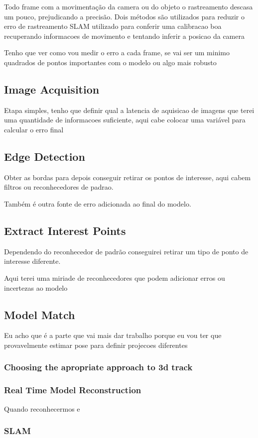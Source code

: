 Todo frame com a movimentação da camera ou do objeto o rastreamento descasa um pouco, prejudicando a precisão.
Dois métodos são utilizados para reduzir o erro de rastreamento
SLAM utilizado para conferir uma calibracao boa recuperando informacoes de movimento e tentando inferir a posicao da camera


Tenho que ver como vou medir o erro a cada frame, se vai ser um minimo quadrados de pontos importantes com o modelo ou algo mais robusto


\subsection{Image Acquisition}

Etapa simples, tenho que definir qual a latencia de aquisicao de imagens que terei uma quantidade de informacoes suficiente, aqui cabe colocar uma variável para calcular o erro final

\subsection{Edge Detection}

Obter as bordas para depois conseguir retirar os pontos de interesse, aqui cabem filtros ou reconhecedores de padrao.

Também é outra fonte de erro adicionada ao final do modelo.

\cite{Drummond99real-timetracking}


\subsection{Extract Interest Points}

Dependendo do reconhecedor de padrão conseguirei retirar um tipo de ponto de interesse diferente.

Aqui terei uma miriade de reconhecedores que podem adicionar erros ou incertezas ao modelo

\subsection{Model Match}


Eu acho que é a parte que vai mais dar trabalho porque eu vou ter que provavelmente estimar pose para definir projecoes diferentes

\subsubsection{Choosing the apropriate approach to 3d track}



\subsubsection{Real Time Model Reconstruction}

Quando reconhecermos e 


\subsubsection{SLAM}


